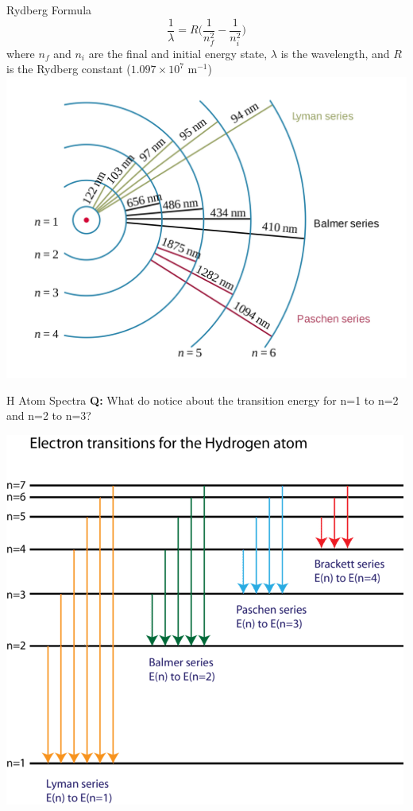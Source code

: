 \documentclass[11pt]{beamer}
\begin{document}
\begin{frame}{Rydberg Formula}
  \begin{equation}
    \frac{1}{\lambda} = R\Bigg(\frac{1}{n_f^2} - \frac{1}{n_i^2}\Bigg)
  \end{equation}
  where $n_f$ and $n_i$ are the final and initial energy state,
  $\lambda$ is the wavelength, and $R$ is the Rydberg constant
  ($1.097\times 10^7$ m$^{-1}$)
  \centering
  \includegraphics[scale=0.08]{h_spectra}
\end{frame}

\begin{frame}{H Atom Spectra}
  \textbf{Q:} What do notice about the transition energy for n=1 to n=2 and
  n=2 to n=3?
  
  \centering
  \includegraphics[scale=0.4]{energy_trans_h}
\end{frame}
\end{document}
